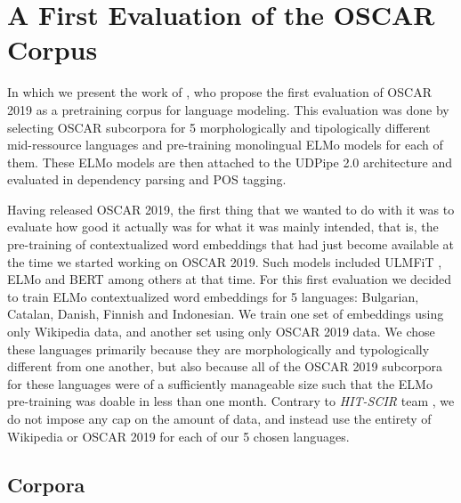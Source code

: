 \chapter{A First Evaluation of the OSCAR Corpus}

\begin{center}
    \begin{minipage}{0.66\textwidth}
        \begin{small}
            In which we present the work of \citet{ortiz-suarez-etal-2020-monolingual}, who propose the first evaluation of OSCAR 2019 as a pretraining corpus for language modeling. This evaluation was done by selecting OSCAR subcorpora for 5 morphologically and tipologically different mid-ressource languages and pre-training monolingual ELMo models \citep{peters-etal-2018-deep} for each of them. These ELMo models are then attached to the UDPipe 2.0 architecture \citep{straka-2018-udpipe,straka-strakova-2019-evaluating} and evaluated in dependency parsing and POS tagging.
        \end{small}
    \end{minipage}
    \vspace{0.5cm}
\end{center}

Having released OSCAR 2019, the first thing that we wanted to do with it was to evaluate how good it actually was for what it was mainly intended, that is, the pre-training of contextualized word embeddings that had just become available at the time we started working on OSCAR 2019. Such models included ULMFiT \citep{howard-ruder-2018-universal}, ELMo \citep{peters-etal-2018-deep} and BERT \citep{devlin-etal-2019-bert} among others at that time. For this first evaluation we decided to train ELMo contextualized word embeddings for 5 languages: Bulgarian, Catalan, Danish, Finnish and Indonesian. We train one set of embeddings using only Wikipedia data, and another set using only OSCAR 2019 data. We chose these languages primarily because they are morphologically and typologically different from one another, but also because all of the OSCAR 2019 subcorpora for these languages were of a sufficiently manageable size such that the ELMo pre-training was doable in less than one month. Contrary to \emph{HIT-SCIR} team \citep{che-etal-2018-towards}, we do not impose any cap on the amount of data, and instead use the entirety of Wikipedia or OSCAR 2019 for each of our 5 chosen languages.

\section{Corpora}

